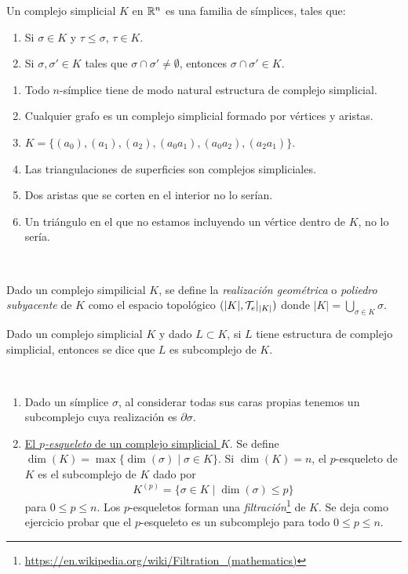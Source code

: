 \documentclass[HS.tex]{subfiles}
\begin{document}
\begin{defi}
Un complejo simplicial $K$ en $\mathbb{R}^n$ es una familia de símplices, tales que:
\begin{enumerate}
\item Si $\sigma\in K$ y $\tau\leq\sigma$, $\tau\in K$.
\item Si $\sigma,\sigma'\in K$ tales que $\sigma\cap\sigma'\neq\emptyset$, entonces $\sigma\cap\sigma'\in K$.
\end{enumerate}
\end{defi}

\begin{ej}
\begin{enumerate}
\item Todo $n$-símplice tiene de modo natural estructura de complejo simplicial.
\item Cualquier grafo es un complejo simplicial formado por vértices y aristas.
\item $K=\{(a_0),(a_1),(a_2),(a_0a_1),(a_0a_2),(a_2a_1)\}$.
\item Las triangulaciones de superficies son complejos simpliciales. 
\item Dos aristas que se corten en el interior no lo serían.
\item Un triángulo en el que no estamos incluyendo un vértice dentro de $K$, no lo sería.
\end{enumerate}
\end{ej}\

\begin{defi}
Dado un complejo simpilicial $K$, se define la \emph{realización geométrica} o \emph{poliedro subyacente} de $K$ como el espacio topológico $(|K|,\mathcal{T}_e|_{|K|})$ donde $|K|=\underset{\sigma\in K}{\bigcup}\sigma$.
\end{defi}

\begin{defi}
Dado un complejo simplicial $K$ y dado $L\subset K$, si $L$ tiene estructura de complejo simplicial, entonces se dice que $L$ es subcomplejo de $K$.
\end{defi}
\begin{ej}\
\begin{enumerate}
\item Dado un símplice $\sigma$, al considerar todas sus caras propias tenemos un subcomplejo cuya realización es $\partial\sigma$.
\item \underline{El \emph{$p$-esqueleto} de un complejo simplicial $K$}. Se define $\dim(K)=\max\{\dim(\sigma)\mid\sigma\in K\}$. Si $\dim(K)=n$, el $p$-esqueleto de $K$ es el subcomplejo de $K$ dado por
$$K^{(p)}=\{\sigma\in K\mid \dim(\sigma)\leq p\}$$
para $0\leq p\leq n$. Los $p$-esqueletos forman una \emph{filtración}\footnote{\url{https://en.wikipedia.org/wiki/Filtration_(mathematics)}} de $K$. Se deja como ejercicio probar que el $p$-esqueleto es un subcomplejo para todo $0\leq p\leq n$.
\end{enumerate}
\end{ej}
\end{document}
